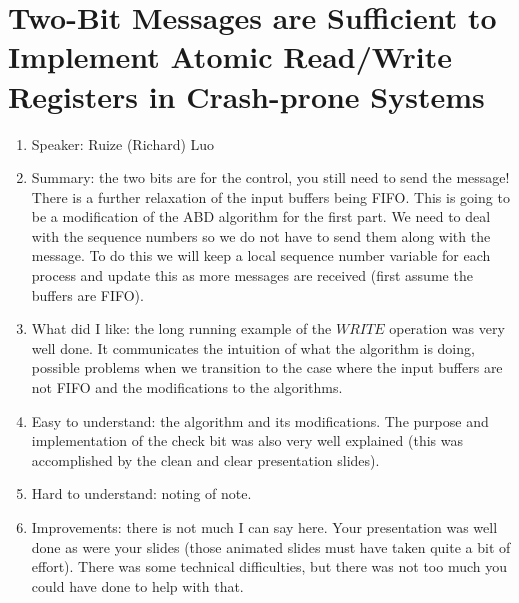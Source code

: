 \documentclass[twoside]{article}
\begin{document}
\section{Two-Bit Messages are Sufficient to Implement Atomic Read/Write Registers in Crash-prone Systems}
\begin{enumerate}
\item Speaker: Ruize (Richard) Luo
\item Summary: the two bits are for the control, you still need to send the message! There is a further relaxation of the input buffers being FIFO. This is going to be a modification of the ABD algorithm for the first part. We need to deal with the sequence numbers so we do not have to send them along with the message. To do this we will keep a local sequence number variable for each process and update this as more messages are received (first assume the buffers are FIFO).   
\item What did I like: the long running example of the $WRITE$ operation was very well done. It communicates the intuition of what the algorithm is doing, possible problems when we transition to the case where the input buffers are not FIFO and the modifications to the algorithms.   
\item Easy to understand: the algorithm and its modifications. The purpose and implementation of the check bit was also very well explained (this was accomplished by the clean and clear presentation slides). 
\item Hard to understand: noting of note.
\item Improvements: there is not much I can say here. Your presentation was well done as were your slides (those animated slides must have taken quite a bit of effort). There was some technical difficulties, but there was not too much you could have done to help with that.
\end{enumerate}
\end{document}
